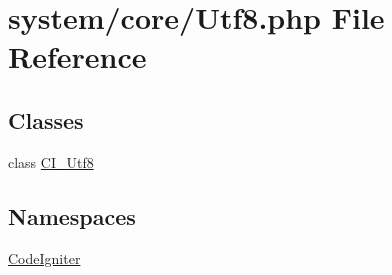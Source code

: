 \hypertarget{_utf8_8php}{}\section{system/core/\+Utf8.php File Reference}
\label{_utf8_8php}
\subsection*{Classes}
\begin{DoxyCompactItemize}
\item 
class \mbox{\hyperlink{class_c_i___utf8}{C\+I\+\_\+\+Utf8}}
\end{DoxyCompactItemize}
\subsection*{Namespaces}
\begin{DoxyCompactItemize}
\item 
 \mbox{\hyperlink{namespace_code_igniter}{Code\+Igniter}}
\end{DoxyCompactItemize}
